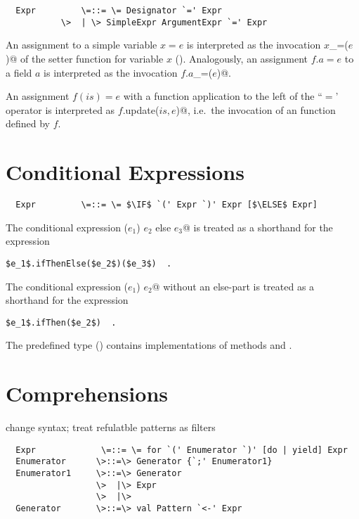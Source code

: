\documentclass[11pt]{report}
\renewcommand{\todo}[1]{#1}
\begin{document}
\begin{itemize}
\syntax\begin{verbatim}
  Expr	       \=::= \= Designator `=' Expr
	       \>  | \> SimpleExpr ArgumentExpr `=' Expr
\end{verbatim}

An assignment to a simple variable $x = e$ is interpreted as the invocation
\verb@$x$_=($e$)@ of the setter function for variable
$x$ ().
Analogously, an assignment $f.a = e$ to a field $a$ is interpreted
as the invocation \verb@$f.a$_=($e$)@.

An assignment $f(is) = e$ with a function application to the
left of the ``$=$' operator is interpreted as \verb@$f$.update($is, e$)@, i.e.\
the invocation of an \verb@update@ function defined by $f$.

\section{Conditional Expressions}

\syntax\begin{verbatim}
  Expr	       \=::= \= $\IF$ `(' Expr `)' Expr [$\ELSE$ Expr]
\end{verbatim}

The conditional expression \verb@if ($e_1$) $e_2$ else $e_3$@ is treated as
a shorthand for the expression
\begin{verbatim}
$e_1$.ifThenElse($e_2$)($e_3$)  .
\end{verbatim}
The conditional expression \verb@if ($e_1$) $e_2$@ without an
else-part is treated as a shorthand for the expression
\begin{verbatim}
$e_1$.ifThen($e_2$)  .
\end{verbatim}
The predefined type \verb@Boolean@ ()
contains implementations of
methods \verb@ifThen@ and \verb@ifThenElse@.

\section{Comprehensions}

\todo{change syntax; treat refulatble patterns as filters}

\syntax\begin{verbatim}
  Expr	           \=::= \= for `(' Enumerator `)' [do | yield] Expr
  Enumerator      \>::=\> Generator {`;' Enumerator1}
  Enumerator1     \>::=\> Generator
                  \>  |\> Expr
                  \>  |\>
  Generator       \>::=\> val Pattern `<-' Expr
\end{verbatim}


\end{itemize}
\end{document}
